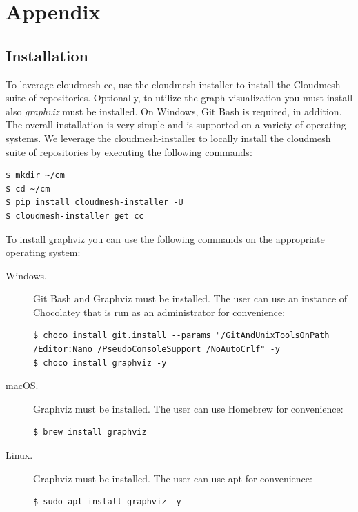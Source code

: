 






\appendix

\section{Appendix}

% 


\subsection{Installation}\label{installation}

To leverage cloudmesh-cc, use the cloudmesh-installer to install the
Cloudmesh suite of repositories. Optionally, to utilize the graph
visualization you must install also {\em graphviz} must be
installed. On Windows, Git Bash is required, in addition.  The overall
installation is very simple and is supported on a variety of operating
systems.  We leverage the cloudmesh-installer to locally install the
cloudmesh suite of repositories by executing the following commands:

\begin{verbatim}
$ mkdir ~/cm
$ cd ~/cm
$ pip install cloudmesh-installer -U
$ cloudmesh-installer get cc
\end{verbatim}

To install graphviz you can use the following commands on the
appropriate operating system:

\begin{description}

\item[Windows.]  Git Bash and Graphviz must be installed. The user
can use an instance of Chocolatey that is run as an administrator for
convenience:

\begin{verbatim}
$ choco install git.install --params "/GitAndUnixToolsOnPath /Editor:Nano /PseudoConsoleSupport /NoAutoCrlf" -y
$ choco install graphviz -y
\end{verbatim}

\item[macOS.] Graphviz must be installed. The user can use Homebrew
for convenience:

\begin{verbatim}
$ brew install graphviz
\end{verbatim}

\item[Linux.] Graphviz must be installed. The user can use apt for
convenience:

\begin{verbatim}
$ sudo apt install graphviz -y
\end{verbatim}

\end{description}


